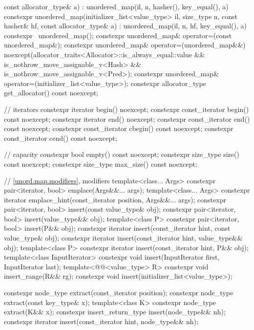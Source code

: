\begin{codeblock}
{{                            const allocator_type& a)
      : unordered_map(il, n, hasher(), key_equal(), a) { }
    constexpr unordered_map(initializer_list<value_type> il, size_type n, const hasher& hf,
                            const allocator_type& a)
      : unordered_map(il, n, hf, key_equal(), a) { }
    constexpr ~unordered_map();
    constexpr unordered_map& operator=(const unordered_map&);
    constexpr unordered_map& operator=(unordered_map&&)
      noexcept(allocator_traits<Allocator>::is_always_equal::value &&
               is_nothrow_move_assignable_v<Hash> &&
               is_nothrow_move_assignable_v<Pred>);
    constexpr unordered_map& operator=(initializer_list<value_type>);
    constexpr allocator_type get_allocator() const noexcept;

    // iterators
    constexpr iterator       begin() noexcept;
    constexpr const_iterator begin() const noexcept;
    constexpr iterator       end() noexcept;
    constexpr const_iterator end() const noexcept;
    constexpr const_iterator cbegin() const noexcept;
    constexpr const_iterator cend() const noexcept;

    // capacity
    constexpr bool empty() const noexcept;
    constexpr size_type size() const noexcept;
    constexpr size_type max_size() const noexcept;

    // \ref{unord.map.modifiers}, modifiers
    template<class... Args> constexpr pair<iterator, bool> emplace(Args&&... args);
    template<class... Args>
      constexpr iterator emplace_hint(const_iterator position, Args&&... args);
    constexpr pair<iterator, bool> insert(const value_type& obj);
    constexpr pair<iterator, bool> insert(value_type&& obj);
    template<class P> constexpr pair<iterator, bool> insert(P&& obj);
    constexpr iterator       insert(const_iterator hint, const value_type& obj);
    constexpr iterator       insert(const_iterator hint, value_type&& obj);
    template<class P> constexpr iterator insert(const_iterator hint, P&& obj);
    template<class InputIterator> constexpr void insert(InputIterator first, InputIterator last);
    template<@@<value_type> R>
      constexpr void insert_range(R&& rg);
    constexpr void insert(initializer_list<value_type>);

    constexpr node_type extract(const_iterator position);
    constexpr node_type extract(const key_type& x);
    template<class K> constexpr node_type extract(K&& x);
    constexpr insert_return_type insert(node_type&& nh);
    constexpr iterator           insert(const_iterator hint, node_type&& nh);

}}
\end{codeblock}
